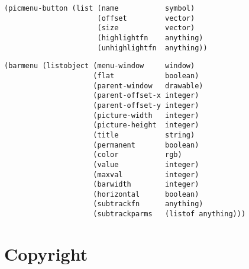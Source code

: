 \vspace*{-.2in}

\begin{verbatim}
(picmenu-button (list (name           symbol)
                      (offset         vector)
                      (size           vector)
                      (highlightfn    anything)
                      (unhighlightfn  anything))
\end{verbatim}

\vspace*{-.2in}

\begin{verbatim}
(barmenu (listobject (menu-window     window)
                     (flat            boolean)
                     (parent-window   drawable)
                     (parent-offset-x integer)
                     (parent-offset-y integer)
                     (picture-width   integer)
                     (picture-height  integer)
                     (title           string)
                     (permanent       boolean)
                     (color           rgb)
                     (value           integer)
                     (maxval          integer)
                     (barwidth        integer)
                     (horizontal      boolean)
                     (subtrackfn      anything)
                     (subtrackparms   (listof anything)))
\end{verbatim}


\pagebreak

\section{Copyright}

